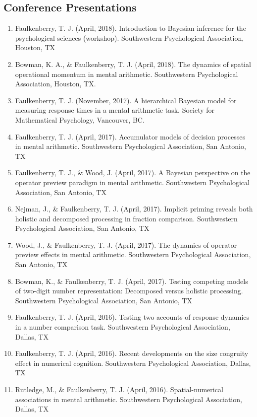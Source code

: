 \documentclass[article,10pt]{article}
\begin{document}
\subsection*{Conference Presentations}
\label{sec:orgac297af}
\begin{enumerate}
\item Faulkenberry, T. J. (April, 2018). Introduction to Bayesian inference for the psychological sciences (workshop). Southwestern Psychological Association, Houston, TX
\item Bowman, K. A., \& Faulkenberry, T. J. (April, 2018). The dynamics of spatial operational momentum in mental arithmetic. Southwestern Psychological Association, Houston, TX.
\item Faulkenberry, T. J. (November, 2017). A hierarchical Bayesian model for measuring response times in a mental arithmetic task. Society for Mathematical Psychology, Vancouver, BC.
\item Faulkenberry, T. J. (April, 2017). Accumulator models of decision processes in mental arithmetic. Southwestern Psychological Association, San Antonio, TX
\item Faulkenberry, T. J., \& Wood, J. (April, 2017). A Bayesian perspective on the operator preview paradigm in mental arithmetic. Southwestern Psychological Association, San Antonio, TX
\item Nejman, J., \& Faulkenberry, T. J. (April, 2017). Implicit priming reveals both holistic and decomposed processing in fraction comparison. Southwestern Psychological Association, San Antonio, TX
\item Wood, J., \& Faulkenberry, T. J. (April, 2017). The dynamics of operator preview effects in mental arithmetic. Southwestern Psychological Association, San Antonio, TX
\item Bowman, K., \& Faulkenberry, T. J. (April, 2017). Testing competing models of two-digit number representation: Decomposed versus holistic processing. Southwestern Psychological Association, San Antonio, TX
\item Faulkenberry, T. J. (April, 2016). Testing two accounts of response dynamics in a number comparison task. Southwestern Psychological Association, Dallas, TX
\item Faulkenberry, T. J. (April, 2016). Recent developments on the size congruity effect in numerical cognition. Southwestern Psychological Association, Dallas, TX
\item Rutledge, M., \& Faulkenberry, T. J. (April, 2016). Spatial-numerical associations in mental arithmetic. Southwestern Psychological Association, Dallas, TX

\end{enumerate}
\end{document}
